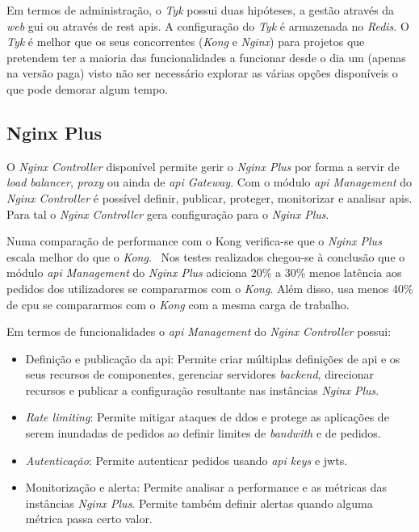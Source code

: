 Em termos de administração, o \textit{Tyk} possui duas hipóteses, a gestão através da \textit{web} \acrshort{gui} ou através de \acrshort{rest} \acrshort{api}s. A configuração do \textit{Tyk} é armazenada no \textit{Redis}. O \textit{Tyk} é melhor que os seus concorrentes (\textit{Kong} e \textit{Nginx}) para projetos que pretendem ter a maioria das funcionalidades a funcionar desde o dia um (apenas na versão paga) visto não ser necessário explorar as várias opções disponíveis o que pode demorar algum tempo.~\cite{compAPIGat}

\subsection{Nginx Plus}

O \textit{Nginx Controller} disponível permite gerir o \textit{Nginx Plus} por forma a servir de \textit{load balancer}, \textit{proxy} ou ainda de \textit{\acrshort{api} Gateway}. Com o módulo \textit{\acrshort{api} Management} do \textit{Nginx Controller} é possível definir, publicar, proteger, monitorizar e analisar \acrshort{api}s. Para tal o \textit{Nginx Controller} gera configuração para o \textit{Nginx Plus}.

Numa comparação de performance com o Kong verifica-se que o \textit{Nginx Plus} escala melhor do que o \textit{Kong}.~\cite{nginxPvsKong} Nos testes realizados chegou-se à conclusão que o módulo \textit{\acrshort{api} Management} do \textit{Nginx Plus} adiciona 20\% a 30\% menos latência aos pedidos dos utilizadores se compararmos com o \textit{Kong}. Além disso, usa menos 40\% de \acrshort{cpu} se compararmos com o \textit{Kong} com a mesma carga de trabalho.

Em termos de funcionalidades o \textit{\acrshort{api} Management} do \textit{Nginx Controller} possui:~\cite{nginxP}
\begin{itemize}
    \item Definição e publicação da \acrshort{api}: Permite criar múltiplas definições de \acrshort{api} e os seus recursos de componentes, gerenciar servidores \textit{backend}, direcionar recursos e publicar a configuração resultante nas instâncias \textit{Nginx Plus}.
    \item \textit{Rate limiting}: Permite mitigar ataques de \acrshort{ddos} e protege as aplicações de serem inundadas de pedidos ao definir limites de \textit{bandwith} e de pedidos.
    \item \textit{Autenticação}: Permite autenticar pedidos usando \textit{\acrshort{api} keys} e \acrshort{jwt}s.
    \item Monitorização e alerta: Permite analisar a performance e as métricas das instâncias \textit{Nginx Plus}. Permite também definir alertas quando alguma métrica passa certo valor.
\end{itemize}


